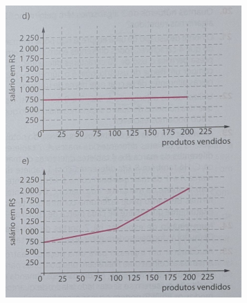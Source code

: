 \documentclass[a4paper,14pt]{article}
\begin{document}
\begin{multicols}{2}
\begin{enumerate}
            \includegraphics[width=1\linewidth]{imagens_8FMA74/imagem5}
        \end{enumerate}

\end{multicols}
\end{document}
